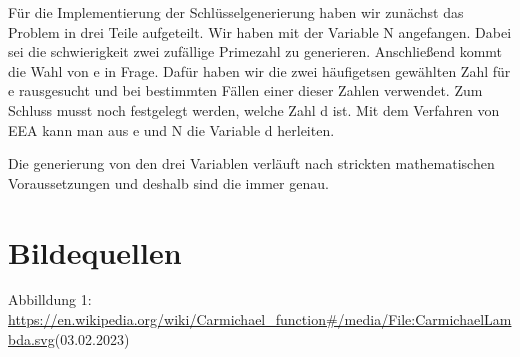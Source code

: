 \documentclass[course=asp]{aspdoc}
\begin{document}
Für die Implementierung der Schlüsselgenerierung haben wir zunächst das Problem in drei Teile aufgeteilt. Wir haben mit der Variable N angefangen. Dabei sei die schwierigkeit zwei zufällige Primezahl zu generieren. Anschließend kommt die Wahl von e in Frage. Dafür haben wir die zwei häufigetsen gewählten Zahl für e rausgesucht und bei bestimmten Fällen einer dieser Zahlen verwendet. Zum Schluss musst noch festgelegt werden, welche Zahl d ist. Mit dem Verfahren von EEA kann man aus e und N die Variable d herleiten. 

Die generierung von den drei Variablen verläuft nach strickten mathematischen Voraussetzungen und deshalb sind die immer genau. 

\section{Bildequellen}
Abbilldung 1: \url{https://en.wikipedia.org/wiki/Carmichael_function#/media/File:CarmichaelLambda.svg}(03.02.2023)


{}
\end{document}
